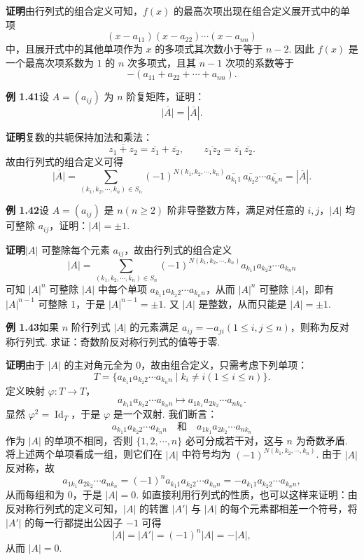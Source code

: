 \documentclass[UTF8, 12pt, fontset=fandol, oneside]{ctexart}
\begin{document}
\noindent\textbf{证明}\quad 由行列式的组合定义可知，$f(x)$ 的最高次项出现在组合定义展开式中的单项
\[
(x-a_{11})(x-a_{22})\cdots(x-a_{nn})
\]
中，且展开式中的其他单项作为 $x$ 的多项式其次数小于等于 $n-2$. 因此 $f(x)$ 是一个最高次项系数为 $1$ 的 $n$ 次多项式，且其 $n-1$ 次项的系数等于
\[
-(a_{11}+a_{22}+\cdots+a_{nn}).
\]

\noindent\textbf{例 1.41}\quad 设 $A=(a_{ij})$ 为 $n$ 阶复矩阵，证明：
\[
\overline{|A|}=|\overline{A}|.
\]

\noindent\textbf{证明}\quad 复数的共轭保持加法和乘法：
\[
\overline{z_1+z_2}=\overline{z_1}+\overline{z_2},\qquad
\overline{z_1z_2}=\overline{z_1}\,\overline{z_2}.
\]
故由行列式的组合定义可得
\[
\overline{|A|}
=\sum_{(k_1,k_2,\cdots,k_n)\in S_n}
(-1)^{N(k_1,k_2,\cdots,k_n)}
\overline{a_{k_1 1}}\,\overline{a_{k_2 2}}\cdots\overline{a_{k_n n}}
=|\overline{A}|.
\]

\noindent\textbf{例 1.42}\quad 设 $A=(a_{ij})$ 是 $n(n\ge2)$ 阶非导整数方阵，满足对任意的 $i,j$，$|A|$ 均可整除 $a_{ij}$，证明：$|A|=\pm1$.

\noindent\textbf{证明}\quad $|A|$ 可整除每个元素 $a_{ij}$，故由行列式的组合定义
\[
|A|=\sum_{(k_1,k_2,\cdots,k_n)\in S_n}
(-1)^{N(k_1,k_2,\cdots,k_n)}a_{k_1 1}a_{k_2 2}\cdots a_{k_n n}
\]
可知 $|A|^n$ 可整除 $|A|$ 中每个单项 $a_{k_1 1}a_{k_2 2}\cdots a_{k_n n}$，从而 $|A|^n$ 可整除 $|A|$，即有 $|A|^{n-1}$ 可整除 $1$，于是 $|A|^{n-1}=\pm1$. 又 $|A|$ 是整数，从而只能是 $|A|=\pm1$.

\noindent\textbf{例 1.43}\quad 如果 $n$ 阶行列式 $|A|$ 的元素满足 $a_{ij}=-a_{ji}(1\le i,j\le n)$，则称为反对称行列式. 求证：奇数阶反对称行列式的值等于零.

\noindent\textbf{证明}\quad 由于 $|A|$ 的主对角元全为 $0$，故由组合定义，只需考虑下列单项：
\[
T=\{a_{k_1 1}a_{k_2 2}\cdots a_{k_n n}\mid k_i\ne i(1\le i\le n)\}.
\]
定义映射 $\varphi:T\to T$，
\[
a_{k_1 1}a_{k_2 2}\cdots a_{k_n n}\mapsto a_{1k_1}a_{2k_2}\cdots a_{nk_n}.
\]
显然 $\varphi^2=\operatorname{Id}_T$，于是 $\varphi$ 是一个双射. 我们断言：
\[
a_{k_1 1}a_{k_2 2}\cdots a_{k_n n}
\quad\text{和}\quad
a_{1k_1}a_{2k_2}\cdots a_{nk_n}
\]
作为 $|A|$ 的单项不相同，否则 $\{1,2,\cdots,n\}$ 必可分成若干对，这与 $n$ 为奇数矛盾. 将上述两个单项看成一组，则它们在 $|A|$ 中符号均为 $(-1)^{N(k_1,k_2,\cdots,k_n)}$. 由于 $|A|$ 反对称，故
\[
a_{1k_1}a_{2k_2}\cdots a_{nk_n}=(-1)^n a_{k_1 1}a_{k_2 2}\cdots a_{k_n n}
=-a_{k_1 1}a_{k_2 2}\cdots a_{k_n n},
\]
从而每组和为 $0$，于是 $|A|=0$. 如直接利用行列式的性质，也可以这样来证明：由反对称行列式的定义可知，$|A|$ 的转置 $|A'|$ 与 $|A|$ 的每个元素都相差一个符号，将 $|A'|$ 的每一行都提出公因子 $-1$ 可得
\[
|A|=|A'|=(-1)^n|A|=-|A|,
\]
从而 $|A|=0$.
\end{document}

